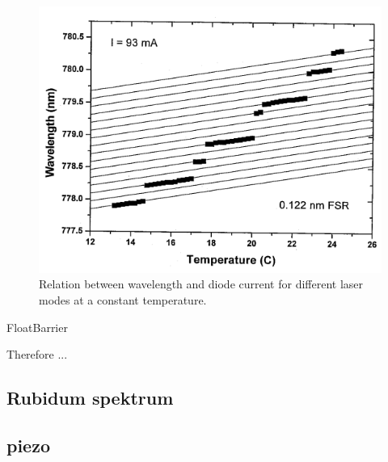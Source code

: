 \FloatBarrier
\begin{figure}
  \includegraphics{medium_gain_temperature.png}
  \caption{Relation between wavelength and diode current
           for different laser modes at a constant temperature.}
  \label{fig:medium_gain_temperature}
\end{figure}
FloatBarrier





Therefore ...


\subsection{Rubidum spektrum}
\label{subsec:}


\subsection{piezo}
\label{subsec:}
